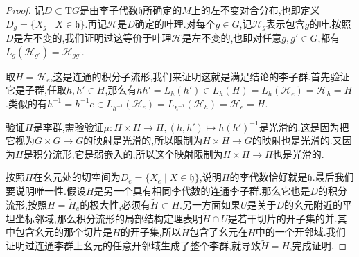 \begin{enumerate}
\begin{proof}
		记$D\subset\mathrm{T}G$是由李子代数$\mathfrak{h}$所确定的$M$上的左不变对合分布,也即定义$D_g=\{X_g\mid X\in\mathfrak{h}\}$.再记$\mathscr{H}$是$D$确定的叶理.对每个$g\in G$,记$\mathscr{H}_g$表示包含$g$的叶.按照$D$是左不变的,我们证明过这等价于叶理$\mathscr{H}$是左不变的,也即对任意$g,g'\in G$,都有$L_g(\mathscr{H}_{g'})=\mathscr{H}_{gg'}$.
		
		取$H=\mathscr{H}_e$,这是连通的积分子流形,我们来证明这就是满足结论的李子群.首先验证它是子群,任取$h,h'\in H$,那么有$hh'=L_h(h')\in L_h(H)=L_h(\mathscr{H}_e)=\mathscr{H}_h=H$.类似的有$h^{-1}=h^{-1}e\in L_{h^{-1}}(\mathscr{H}_e)=L_{h^{-1}}(\mathscr{H}_h)=\mathscr{H}_e=H$.
		
		验证$H$是李群,需验验证$\mu:H\times H\to H,(h,h')\mapsto h(h')^{-1}$是光滑的.这是因为把它视为$G\times G\to G$的映射是光滑的,所以限制为$H\times H\to G$的映射也是光滑的.又因为$H$是积分流形,它是弱嵌入的,所以这个映射限制为$H\times H\to H$也是光滑的.
		
		按照$H$在幺元处的切空间为$D_e=\{X_e\mid X\in\mathfrak{h}\}$,说明$H$的李代数恰好就是$\mathfrak{h}$.最后我们要说明唯一性.假设$\widetilde{H}$是另一个具有相同李代数的连通李子群.那么它也是$D$的积分流形,按照$H=\widetilde{H}_e$的极大性,必须有$\widetilde{H}\subset H$.另一方面如果$U$是关于$D$的幺元附近的平坦坐标邻域,那么积分流形的局部结构定理表明$\widetilde{H}\cap U$是若干切片的开子集的并.其中包含幺元的那个切片是$H$的开子集,所以$\widetilde{H}$包含了幺元在$H$中的一个开邻域.我们证明过连通李群上幺元的任意开邻域生成了整个李群,就导致$\widetilde{H}=H$,完成证明.
	\end{proof}
\end{enumerate}

